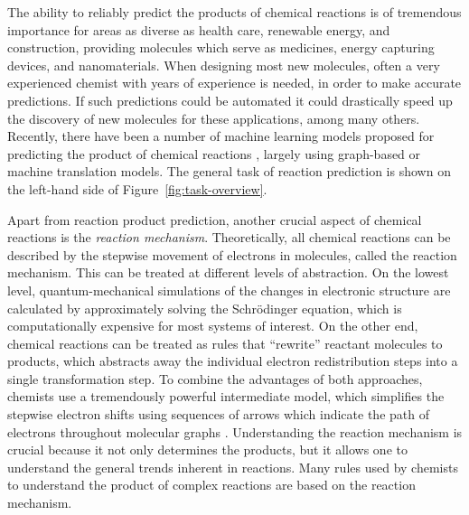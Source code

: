 
The ability to reliably predict the products of chemical reactions is of tremendous importance for areas as diverse as health care, renewable energy, and construction, providing molecules which serve as medicines, energy capturing devices, and nanomaterials. 
When designing most new molecules, often a very experienced chemist with years of experience is needed, in order to make accurate predictions. 
If such predictions could be automated it could drastically speed up the discovery of new molecules for these applications, among many others. Recently, there have been a number of machine learning models proposed for predicting the product of chemical reactions \cite{coley2017prediction,jin2017predicting,schwaller2017found,neural-symbolic,segler2018planning,wei2016neural,zhang2005structure}, largely using graph-based or machine translation models. The general task of reaction prediction is shown on the left-hand side of Figure~\ref{fig:task-overview}.

Apart from reaction product prediction, another crucial aspect of chemical reactions is the \emph{reaction mechanism}. Theoretically, all chemical reactions can be described by the stepwise movement of electrons in molecules, called the reaction mechanism.
This can be treated at different levels of abstraction. On the lowest level, quantum-mechanical simulations of the  changes in electronic structure are calculated by approximately solving the Schr\"odinger equation, which is computationally expensive for most systems of interest. 
On the other end, chemical reactions can be treated as rules that ``rewrite'' reactant molecules to products, which abstracts away the individual electron redistribution steps into a single transformation step. 
To combine the advantages of both approaches, chemists use a tremendously powerful intermediate model, which simplifies the stepwise electron shifts using sequences of arrows which indicate the path of electrons throughout molecular graphs \cite{herges1994organizing}. 
Understanding the reaction mechanism is crucial because it not only determines the products, but it allows one to understand the general trends inherent in reactions.
Many rules used by chemists to understand the product of complex reactions are based on the reaction mechanism.



